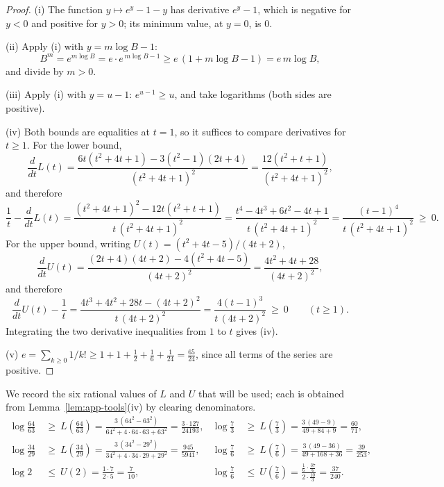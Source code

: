 \documentclass[11pt]{article}
\theoremstyle{remark}
\theoremstyle{plain}
\theoremstyle{plain}
\begin{document}
\begin{proof}
(i) The function $y\mapsto e^y-1-y$ has derivative $e^y-1$, which is
negative for $y<0$ and positive for $y>0$; its minimum value, at $y=0$, is
$0$.

(ii) Apply (i) with $y=m\log B-1$:
\[
        B^m=e^{m\log B}=e\cdot e^{\,m\log B-1}\ge e\,(1+m\log B-1)=e\,m\log B,
\]
and divide by $m>0$.

(iii) Apply (i) with $y=u-1$: $e^{u-1}\ge u$, and take logarithms (both
sides are positive).

(iv) Both bounds are equalities at $t=1$, so it suffices to compare
derivatives for $t\ge1$.  For the lower bound,
\[
        \frac{d}{dt}L(t)
        =\frac{6t(t^2+4t+1)-3(t^2-1)(2t+4)}{(t^2+4t+1)^2}
        =\frac{12(t^2+t+1)}{(t^2+4t+1)^2},
\]
and therefore
\[
        \frac{1}{t}-\frac{d}{dt}L(t)
        =\frac{(t^2+4t+1)^2-12t(t^2+t+1)}{t\,(t^2+4t+1)^2}
        =\frac{t^4-4t^3+6t^2-4t+1}{t\,(t^2+4t+1)^2}
        =\frac{(t-1)^4}{t\,(t^2+4t+1)^2}\ \ge\ 0 .
\]
For the upper bound, writing $U(t)=(t^2+4t-5)/(4t+2)$,
\[
        \frac{d}{dt}U(t)
        =\frac{(2t+4)(4t+2)-4(t^2+4t-5)}{(4t+2)^2}
        =\frac{4t^2+4t+28}{(4t+2)^2},
\]
and therefore
\[
        \frac{d}{dt}U(t)-\frac1t
        =\frac{4t^3+4t^2+28t-(4t+2)^2}{t\,(4t+2)^2}
        =\frac{4(t-1)^3}{t\,(4t+2)^2}\ \ge\ 0
        \qquad(t\ge1).
\]
Integrating the two derivative inequalities from $1$ to $t$ gives (iv).

(v) $e=\sum_{k\ge0}1/k!\ge1+1+\frac12+\frac16+\frac1{24}=\frac{65}{24}$,
since all terms of the series are positive.
\end{proof}

We record the six rational values of $L$ and $U$ that will be used; each is
obtained from Lemma~\ref{lem:app-tools}(iv) by clearing denominators.
\begin{equation}\label{eq:app-pade-values}
\begin{aligned}
        \log\frac{64}{63}&\ \ge\ L\!\left(\frac{64}{63}\right)
        =\frac{3\,(64^2-63^2)}{64^2+4\cdot64\cdot63+63^2}
        =\frac{3\cdot127}{24193},
        &
        \log\frac73&\ \ge\ L\!\left(\frac73\right)
        =\frac{3\,(49-9)}{49+84+9}
        =\frac{60}{71},
        \\[1mm]
        \log\frac{34}{29}&\ \ge\ L\!\left(\frac{34}{29}\right)
        =\frac{3\,(34^2-29^2)}{34^2+4\cdot34\cdot29+29^2}
        =\frac{945}{5941},
        &
        \log\frac76&\ \ge\ L\!\left(\frac76\right)
        =\frac{3\,(49-36)}{49+168+36}
        =\frac{39}{253},
        \\[1mm]
        \log 2&\ \le\ U(2)
        =\frac{1\cdot7}{2\cdot5}
        =\frac{7}{10},
        &
        \log\frac76&\ \le\ U\!\left(\frac76\right)
        =\frac{\frac16\cdot\frac{37}6}{2\cdot\frac{10}3}
        =\frac{37}{240}.
\end{aligned}
\end{equation}
\end{document}
